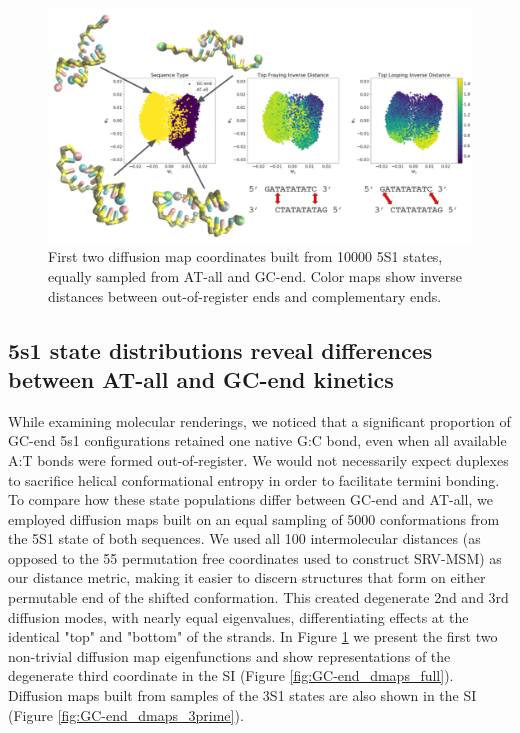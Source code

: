 \documentclass[journal=jpcbfk,manuscript=article]{achemso}
\begin{document}
\begin{figure}[ht!]
	\begin{center}
        \includegraphics[width=450, scale=1]{Fig7.pdf}
        \caption{First two diffusion map coordinates built from 10000 5S1 states, equally sampled from AT-all and GC-end. Color maps show inverse distances between out-of-register ends and complementary ends.}
        \label{fig:GC-end_dmaps}
	\end{center}
\end{figure}

\subsection{5s1 state distributions reveal differences between AT-all and GC-end kinetics}

While examining molecular renderings, we noticed that a significant proportion of GC-end 5s1 configurations retained one native G:C bond, even when all available A:T bonds were formed out-of-register. We would not necessarily expect duplexes to sacrifice helical conformational entropy in order to facilitate termini bonding. To compare how these state populations differ between GC-end and AT-all, we employed diffusion maps built on an equal sampling of 5000 conformations from the 5S1 state of both sequences. We used all 100 intermolecular distances (as opposed to the 55 permutation free coordinates used to construct SRV-MSM) as our distance metric, making it easier to discern structures that form on either permutable end of the shifted conformation. This created degenerate 2nd and 3rd diffusion modes, with nearly equal eigenvalues, differentiating effects at the identical "top" and "bottom" of the strands. In Figure \ref{fig:GC-end_dmaps} we present the first two non-trivial diffusion map eigenfunctions and show representations of the degenerate third coordinate in the SI (Figure \ref{fig:GC-end_dmaps_full}). Diffusion maps built from samples of the 3S1 states are also shown in the SI (Figure \ref{fig:GC-end_dmaps_3prime}). 
\end{document}

